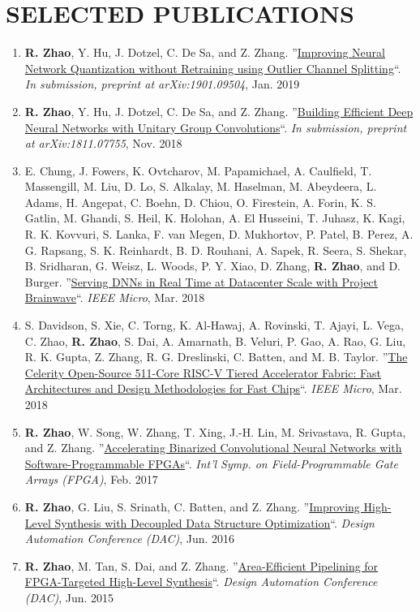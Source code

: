 \documentclass[11pt,a4paper,roman]{moderncv}        %
\newcommand{\BF}[1]{\textbf{#1}}
\newcommand{\IT}[1]{\textit{#1}}
\newcommand{\UL}[1]{\uline{#1}}
\newcommand*{\customcvpub}[5][.5em]{
  {#2 ''\UL{#3}``. \IT{#4}, #5}
  \par\addvspace{#1}
}
\begin{document}
\section{SELECTED PUBLICATIONS}
\vspace{1mm}
\begin{minipage}{\maincolumnwidth}%
	\small{
	\begin{enumerate}
	    \item \customcvpub{\BF{R. Zhao}, Y. Hu, J. Dotzel, C. De Sa, and Z. Zhang.}{Improving Neural Network Quantization without Retraining using Outlier Channel Splitting}{In submission, preprint at arXiv:1901.09504}{Jan. 2019}
    	\item \customcvpub{\BF{R. Zhao}, Y. Hu, J. Dotzel, C. De Sa, and Z. Zhang.}{Building Efficient Deep Neural Networks with Unitary Group Convolutions}{In submission, preprint at arXiv:1811.07755}{Nov. 2018}
        \item \customcvpub{E. Chung, J. Fowers, K. Ovtcharov, M. Papamichael, A. Caulfield, T. Massengill, M. Liu, D. Lo, S. Alkalay, M. Haselman, M. Abeydeera, L. Adams, H. Angepat, C. Boehn, D. Chiou, O. Firestein, A. Forin, K. S. Gatlin, M. Ghandi, S. Heil, K. Holohan, A. El Husseini, T. Juhasz, K. Kagi, R. K. Kovvuri, S. Lanka, F. van Megen, D. Mukhortov, P. Patel, B. Perez, A. G. Rapsang, S. K. Reinhardt, B. D. Rouhani, A. Sapek, R. Seera, S. Shekar, B. Sridharan, G. Weisz, L. Woods, P. Y. Xiao, D. Zhang, \BF{R. Zhao}, and D. Burger.}{Serving DNNs in Real Time at Datacenter Scale with Project Brainwave}{IEEE Micro}{Mar. 2018}
        \item \customcvpub{S. Davidson, S. Xie, C. Torng, K. Al-Hawaj, A. Rovinski, T. Ajayi, L. Vega, C. Zhao, \BF{R. Zhao}, S. Dai, A. Amarnath, B. Veluri, P. Gao, A. Rao, G. Liu, R. K. Gupta, Z. Zhang, R. G. Dreslinski, C. Batten, and M. B. Taylor.}{The Celerity Open-Source 511-Core RISC-V Tiered Accelerator Fabric: Fast Architectures and Design Methodologies for Fast Chips}{IEEE Micro}{Mar. 2018}
        \item \customcvpub{\BF{R. Zhao}, W. Song, W. Zhang, T. Xing, J.-H. Lin, M. Srivastava, R. Gupta, and Z. Zhang.}{Accelerating Binarized Convolutional Neural Networks with Software-Programmable FPGAs}{Int’l Symp. on Field-Programmable Gate Arrays (FPGA)}{Feb. 2017}
        \item \customcvpub{\BF{R. Zhao}, G. Liu, S. Srinath, C. Batten, and Z. Zhang.}{Improving High-Level Synthesis with Decoupled Data Structure Optimization}{Design Automation Conference (DAC)}{Jun. 2016}
        \item \customcvpub{\BF{R. Zhao}, M. Tan, S. Dai, and Z. Zhang.}{Area-Efficient Pipelining for FPGA-Targeted High-Level Synthesis}{Design Automation Conference (DAC)}{Jun. 2015}
    \end{enumerate}
    }
\end{minipage}%
\end{document}
